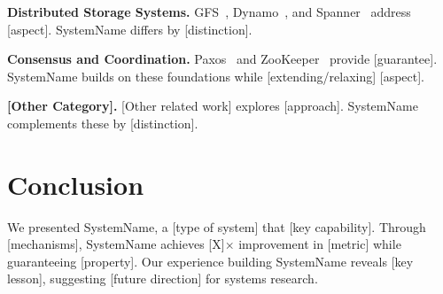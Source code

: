 \documentclass[sigplan,10pt]{acmart}
\newcommand{\system}{SystemName\xspace}
\newcommand{\para}[1]{\smallskip\noindent\textbf{#1.}}
\begin{document}

\para{Distributed Storage Systems}
GFS~\cite{ghemawat2003gfs}, Dynamo~\cite{decandia2007dynamo}, and
Spanner~\cite{corbett2013spanner} address [aspect]. \system differs by
[distinction].

\para{Consensus and Coordination}
Paxos~\cite{lamport1998paxos} and ZooKeeper~\cite{hunt2010zookeeper}
provide [guarantee]. \system builds on these foundations while
[extending/relaxing] [aspect].

\para{[Other Category]}
[Other related work] explores [approach]. \system complements these
by [distinction].

\section{Conclusion}
\label{sec:conclusion}

We presented \system, a [type of system] that [key capability].
Through [mechanisms], \system achieves [X]$\times$ improvement in
[metric] while guaranteeing [property].
Our experience building \system reveals [key lesson], suggesting
[future direction] for systems research.





\end{document}
